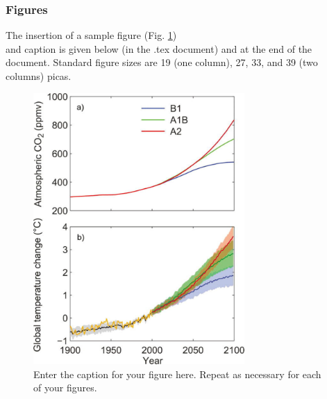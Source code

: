 \documentclass[draft]{ametsoc}
\begin{document}
\subsubsection{Figures}\label{figures}

The insertion of a sample figure (Fig. \ref{f1})\\
and caption is given below (in the .tex document) and at the end of the
document. Standard figure sizes are 19 (one column), 27, 33, and 39 (two
columns) picas.

\begin{figure}[h]
 \centerline{\includegraphics[width=19pc]{figure01.pdf}}
  \caption{Enter the caption for your figure here.  Repeat as
  necessary for each of your figures.}\label{f1}
\end{figure}
\end{document}
